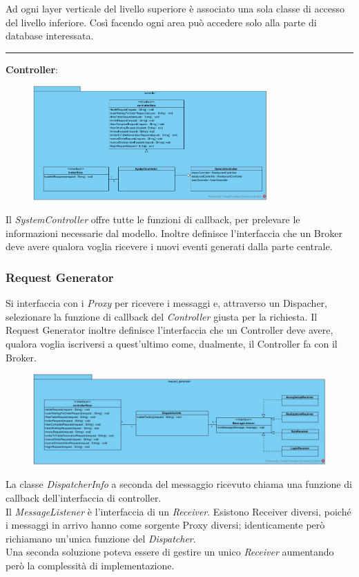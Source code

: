 Ad ogni layer verticale del livello superiore è associato una sola classe di accesso del livello inferiore. Così facendo ogni area può accedere solo alla parte di database interessata. 
\vspace{0.5cm}
\hrule
\vspace{0.5cm}
\textbf{Controller}:
\begin{figure}[H]
	\centering
	\includegraphics[width=0.8\textwidth]{Immagini/controller.jpg}
\end{figure}
Il \textit{SystemController} offre tutte le funzioni di callback, per prelevare le informazioni necessarie dal modello. Inoltre definisce l’interfaccia che un Broker deve avere qualora voglia ricevere i nuovi eventi generati dalla parte centrale.

\subsubsection{Request Generator}
Si interfaccia con i \textit{Proxy} per ricevere i messaggi e, attraverso un Dispacher, selezionare la funzione di callback del \textit{Controller} giusta per la richiesta. Il Request Generator inoltre definisce l’interfaccia che un Controller deve avere, qualora voglia iscriversi a quest’ultimo come, dualmente, il Controller fa con il Broker.
\begin{figure}[H]
	\centering
	\includegraphics[width=\textwidth]{Immagini/request_generator.jpg}
\end{figure}
La classe \textit{DispatcherInfo} a seconda del messaggio ricevuto chiama una funzione di callback dell'interfaccia di controller.
\\Il \textit{MessageListener} è l'interfaccia di un \textit{Receiver}. Esistono Receiver diversi, poiché i messaggi in arrivo hanno come sorgente Proxy diversi; identicamente però richiamano un'unica funzione del \textit{Dispatcher}.
\\Una seconda soluzione poteva essere di gestire un unico \textit{Receiver} aumentando però la complessità di implementazione. 	

